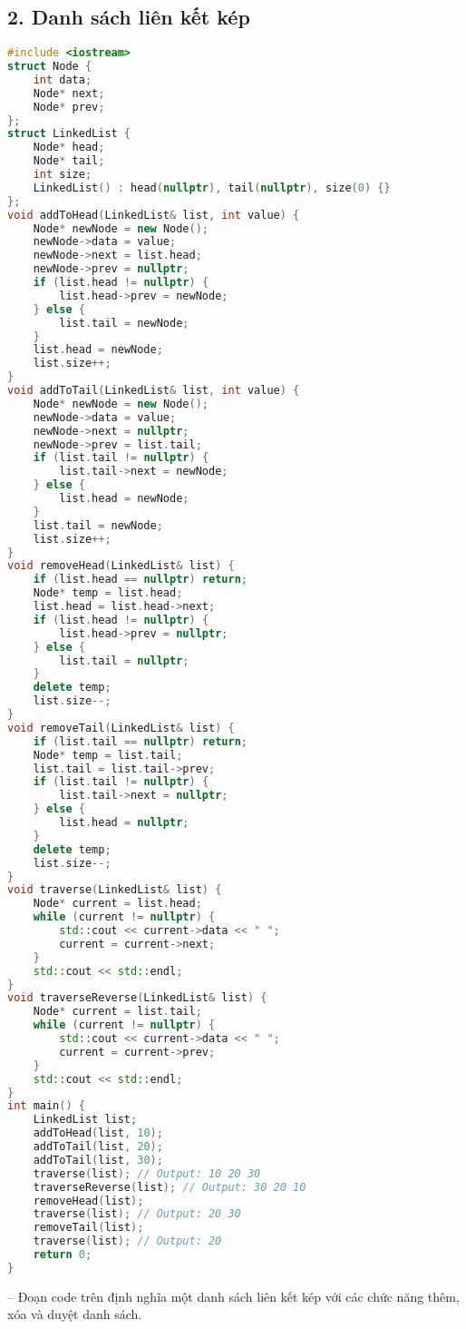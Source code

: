 \subsection*{2. Danh sách liên kết kép}
\begin{lstlisting}[language=C++]
#include <iostream>
struct Node {
    int data; 
    Node* next; 
    Node* prev; 
};
struct LinkedList {
    Node* head; 
    Node* tail; 
    int size;
    LinkedList() : head(nullptr), tail(nullptr), size(0) {} 
};
void addToHead(LinkedList& list, int value) {
    Node* newNode = new Node();
    newNode->data = value;
    newNode->next = list.head;
    newNode->prev = nullptr;
    if (list.head != nullptr) {
        list.head->prev = newNode; 
    } else {
        list.tail = newNode; 
    }
    list.head = newNode;
    list.size++;
}
void addToTail(LinkedList& list, int value) {
    Node* newNode = new Node();
    newNode->data = value;
    newNode->next = nullptr;
    newNode->prev = list.tail;
    if (list.tail != nullptr) {
        list.tail->next = newNode; 
    } else {
        list.head = newNode; 
    }
    list.tail = newNode;
    list.size++;
}
void removeHead(LinkedList& list) {
    if (list.head == nullptr) return; 
    Node* temp = list.head;
    list.head = list.head->next;
    if (list.head != nullptr) {
        list.head->prev = nullptr; 
    } else {
        list.tail = nullptr; 
    }
    delete temp;
    list.size--;
}
void removeTail(LinkedList& list) {
    if (list.tail == nullptr) return; 
    Node* temp = list.tail;
    list.tail = list.tail->prev;
    if (list.tail != nullptr) {
        list.tail->next = nullptr; 
    } else {
        list.head = nullptr; 
    }
    delete temp;
    list.size--;
}
void traverse(LinkedList& list) {
    Node* current = list.head;
    while (current != nullptr) {
        std::cout << current->data << " ";
        current = current->next;
    }
    std::cout << std::endl;
}
void traverseReverse(LinkedList& list) {
    Node* current = list.tail;
    while (current != nullptr) {
        std::cout << current->data << " ";
        current = current->prev;
    }
    std::cout << std::endl;
}
int main() {
    LinkedList list;
    addToHead(list, 10);
    addToTail(list, 20);
    addToTail(list, 30);
    traverse(list); // Output: 10 20 30
    traverseReverse(list); // Output: 30 20 10
    removeHead(list);
    traverse(list); // Output: 20 30
    removeTail(list);
    traverse(list); // Output: 20
    return 0;
}
\end{lstlisting}
\vspace{-3.5em}
-- Đoạn code trên định nghĩa một danh sách liên kết kép với các chức năng thêm, xóa và duyệt danh sách.\\

